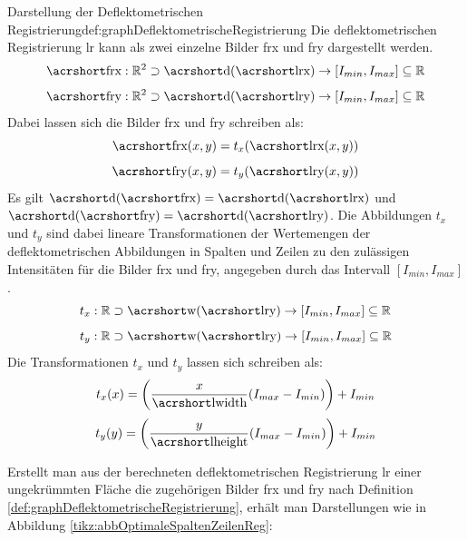 \begin{Definition}{Darstellung der Deflektometrischen Registrierung}{def:graphDeflektometrischeRegistrierung}
	Die deflektometrischen Registrierung \acrshort{lr} kann als zwei einzelne Bilder \acrshort{frx} und \acrshort{fry} dargestellt werden.
	\begin{equation*}
		\acrshortmath{frx} : \mathbb{R}^2 \supset \acrshortmath{d}(\acrshortmath{lrx}) \rightarrow [I_{min},I_{max}] \subseteq \mathbb{R}
	\end{equation*}
	\begin{equation*}
		\acrshortmath{fry} : \mathbb{R}^2 \supset \acrshortmath{d}(\acrshortmath{lry}) \rightarrow [I_{min},I_{max}] \subseteq \mathbb{R}
	\end{equation*}
	Dabei lassen sich die Bilder \acrshort{frx} und \acrshort{fry} schreiben als:
	\begin{equation*}
		\acrshortmath{frx}(x,y) = t_x(\acrshortmath{lrx}(x,y))
	\end{equation*}
	\begin{equation*}
		\acrshortmath{fry}(x,y) = t_y(\acrshortmath{lry}(x,y))
	\end{equation*}
	Es gilt $\acrshortmath{d}(\acrshortmath{frx}) = \acrshortmath{d}(\acrshortmath{lrx})$ und $\acrshortmath{d}(\acrshortmath{fry}) = \acrshortmath{d}(\acrshortmath{lry})$.
	Die Abbildungen $t_x$ und $t_y$ sind dabei lineare Transformationen der Wertemengen der deflektometrischen Abbildungen in Spalten und Zeilen zu den zulässigen Intensitäten für die Bilder \acrshort{frx} und \acrshort{fry}, angegeben durch das Intervall $[I_{min},I_{max}]$.
	\begin{equation*}
		t_x : \mathbb{R} \supset \acrshortmath{w}(\acrshortmath{lry}) \rightarrow [I_{min},I_{max}] \subseteq \mathbb{R}
	\end{equation*}
	\begin{equation*}
		t_y : \mathbb{R} \supset \acrshortmath{w}(\acrshortmath{lry}) \rightarrow [I_{min},I_{max}] \subseteq \mathbb{R}
	\end{equation*}
	Die Transformationen $t_x$ und $t_y$ lassen sich schreiben als:
	\begin{equation*}
		t_x(x) = \left(\dfrac{x}{\acrshortmath{lwidth}}(I_{max} - I_{min})\right) + I_{min}
	\end{equation*}
	\begin{equation*}
		t_y(y) = \left(\dfrac{y}{\acrshortmath{lheight}}(I_{max} - I_{min})\right) + I_{min}
	\end{equation*}
\end{Definition}
%
Erstellt man aus der berechneten deflektometrischen Registrierung \acrshort{lr} einer ungekrümmten Fläche die zugehörigen Bilder \acrshort{frx} und \acrshort{fry} nach Definition \ref{def:graphDeflektometrischeRegistrierung}, erhält man Darstellungen wie in Abbildung \ref{tikz:abbOptimaleSpaltenZeilenReg}:

